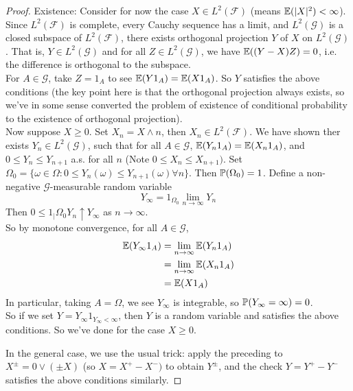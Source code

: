 \documentclass[a4paper]{article}
\begin{document}
\begin{thm}
\begin{proof}
        Existence: Consider for now the case $X \in L^2(\mathcal{F})$ (means $\E(|X|^2) < \infty$). Since $L^2(\mathcal{F})$ is complete, every Cauchy sequence has a limit, and $L^2(\mathcal{G})$ is a closed subspace of $L^2(\mathcal{F})$, there exists orthogonal projection $Y$ of $X$ on $L^2(\mathcal{G})$. That is, $Y \in L^2(\mathcal{G})$ and for all $Z \in L^2(\mathcal{G})$, we have $\E((Y-X)Z) = 0$, i.e. the difference is orthogonal to the subspace.\\
        For $A \in \mathcal{G}$, take $Z = 1_A$ to see $\E(Y1_A) = \E(X1_A)$. So $Y$ satisfies the above conditions (the key point here is that the orthogonal projection always exists, so we've in some sense converted the problem of existence of conditional probability to the existence of orthogonal projection).\\
        Now suppose $X \geq 0$. Set $X_n = X \wedge n$, then $X_n \in L^2(\mathcal{F})$. We have shown ther exists $Y_n \in L^2(\mathcal{G})$, such that for all $A \in \mathcal{G}$, $\E(Y_n1_A) = \E(X_n1_A)$, and $0 \leq Y_n \leq Y_{n+1}$ a.s. for all $n$ (Note $0 \leq X_n \leq X_{n+1})$. Set $\Omega_0 = \{\omega \in \Omega: 0 \leq Y_n(\omega) \leq Y_{n+1}(\omega) \forall n\}$. Then $\P(\Omega_0) = 1$. Define a non-negative $\mathcal{G}$-measurable random variable $$Y_\infty = 1_{\Omega_0} \lim_{n \to \infty} Y_n$$
        Then $0 \leq 1_|{\Omega_0 Y_n} \uparrow Y_\infty$ as $n \to \infty$.\\
        So by monotone convergence, for all $A \in \mathcal{G}$,
        \begin{equation*}
            \begin{aligned}
                \E(Y_\infty 1_A) &= \lim_{n \to \infty} \E(Y_n 1_A)\\
                &= \lim_{n \to \infty} \E(X_n 1_A)\\
                &= \E(X 1_A)
            \end{aligned}
        \end{equation*}
        In particular, taking $A=\Omega$, we see $Y_\infty$ is integrable, so $\P(Y_\infty = \infty) = 0$.\\
        So if we set $Y = Y_\infty 1_{Y_\infty < \infty}$, then $Y$ is a random variable and satisfies the above conditions. So we've done for the case $X \geq 0$.

        In the general case, we use the usual trick: apply the preceding to $X^\pm = 0 \vee (\pm X)$ (so $X = X^+-X^-)$ to obtain $Y^\pm$, and the check $Y=Y^+-Y^-$ satisfies the above conditions similarly.
    \end{proof}
\end{thm}
\end{document}
